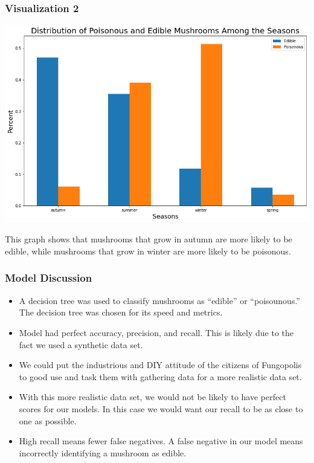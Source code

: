 \documentclass[]{beamer}
\begin{document}
\begin{frame}
\frametitle{Visualization 2}
\begin{center}
\includegraphics[scale = 0.3]{toxicity_by_season.png}
\end{center}

\pause
This graph shows that mushrooms that grow in autumn are more likely to be edible, while mushrooms that grow in winter are more likely to be poisonous.
\end{frame}


\begin{frame}
\frametitle{Model Discussion}
\begin{itemize}
\pause
\item A decision tree was used to classify mushrooms as ``edible'' or ``poisounous.'' The decision tree was chosen for its speed and metrics.
\pause
\item Model had perfect accuracy, precision, and recall. This is likely due to the fact we used a synthetic data set.
\pause
\item We could put the industrious and DIY attitude of the citizens of Fungopolis to good use and task them with gathering data for a more realistic data set. 
\pause
\item With this more realistic data set, we would not be likely to have perfect scores for our models. In this case we would want our recall to be as close to one as possible.
\pause
\item High recall means fewer false negatives. A false negative in our model means incorrectly identifying a mushroom as edible.
\end{itemize}
\end{frame}
\end{document}
